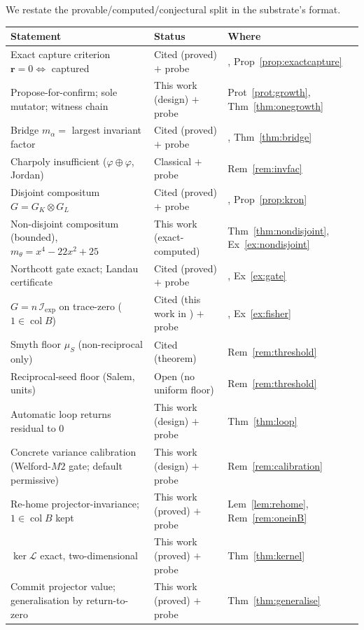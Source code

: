 \documentclass[11pt]{article}
\theoremstyle{plain}
\theoremstyle{definition}
\theoremstyle{remark}
\newcommand{\K}{K}
\newcommand{\Fish}{\mathcal{I}}
\newcommand{\rr}{\mathbf{r}}
\newcommand{\GG}{G}
\newcommand{\BB}{B}
\newcommand{\Lop}{\mathcal{L}}
\DeclareMathOperator{\col}{col}
\begin{document}
We restate the provable/computed/conjectural split in the substrate's format.

\begin{table}[ht]
\centering
\footnotesize
\begin{tabular}{p{} l l}
\toprule
Statement & Status & Where \\
\midrule
Exact capture criterion $\rr=0\iff$ captured & Cited (proved) $+$ probe & \cite{VectorSubstrate}, Prop~\ref{prop:exactcapture} \\
Propose-for-confirm; sole mutator; witness chain & This work (design) $+$ probe & Prot~\ref{prot:growth}, Thm~\ref{thm:onegrowth} \\
Bridge $m_\alpha=$ largest invariant factor & Cited (proved) $+$ probe & \cite{VectorSubstrate}, Thm~\ref{thm:bridge} \\
Charpoly insufficient ($\varphi\!\oplus\!\varphi$, Jordan) & Classical $+$ probe & Rem~\ref{rem:invfac} \\
Disjoint compositum $\GG=\GG_\K\otimes\GG_L$ & Cited (proved) $+$ probe & \cite{VectorSubstrate}, Prop~\ref{prop:kron} \\
Non-disjoint compositum (bounded), $m_\theta=x^4{-}22x^2{+}25$ & This work (exact-computed) & Thm~\ref{thm:nondisjoint}, Ex~\ref{ex:nondisjoint} \\
Northcott gate exact; Landau certificate & Cited (proved) $+$ probe & \cite{VectorSubstrate}, Ex~\ref{ex:gate} \\
$\GG=n\,\Fish_{\mathrm{exp}}$ on trace-zero ($1\in\col\BB$) & Cited (this work in \cite{VectorSubstrate}) $+$ probe & \cite{VectorSubstrate}, Ex~\ref{ex:fisher} \\
Smyth floor $\mu_S$ (non-reciprocal only) & Cited (theorem) & Rem~\ref{rem:threshold} \\
Reciprocal-seed floor (Salem, units) & Open (no uniform floor) & Rem~\ref{rem:threshold} \\
Automatic loop returns residual to $0$ & This work (design) $+$ probe & Thm~\ref{thm:loop} \\
Concrete variance calibration (Welford-$M2$ gate; default permissive) & This work (design) $+$ probe & Rem~\ref{rem:calibration} \\
Re-home projector-invariance; $1\in\col\BB$ kept & This work (proved) $+$ probe & Lem~\ref{lem:rehome}, Rem~\ref{rem:oneinB} \\
$\ker\Lop$ exact, two-dimensional & This work (proved) $+$ probe & Thm~\ref{thm:kernel} \\
Commit projector value; generalisation by return-to-zero & This work (proved) $+$ probe & Thm~\ref{thm:generalise} \\

\end{tabular}
\end{table}
\end{document}
